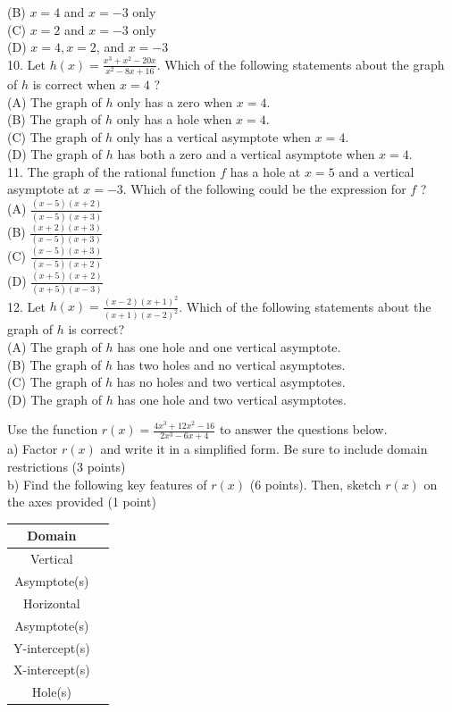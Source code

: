 \documentclass[10pt]{article}
\begin{document}
(B) $x=4$ and $x=-3$ only\\
(C) $x=2$ and $x=-3$ only\\
(D) $x=4, x=2$, and $x=-3$\\
10. Let $h(x)=\frac{x^{3}+x^{2}-20 x}{x^{2}-8 x+16}$. Which of the following statements about the graph of $h$ is correct when $x=4$ ?\\
(A) The graph of $h$ only has a zero when $x=4$.\\
(B) The graph of $h$ only has a hole when $x=4$.\\
(C) The graph of $h$ only has a vertical asymptote when $x=4$.\\
(D) The graph of $h$ has both a zero and a vertical asymptote when $x=4$.\\
11. The graph of the rational function $f$ has a hole at $x=5$ and a vertical asymptote at $x=-3$. Which of the following could be the expression for $f$ ?\\
(A) $\frac{(x-5)(x+2)}{(x-5)(x+3)}$\\
(B) $\frac{(x+2)(x+3)}{(x-5)(x+3)}$\\
(C) $\frac{(x-5)(x+3)}{(x-5)(x+2)}$\\
(D) $\frac{(x+5)(x+2)}{(x+5)(x-3)}$\\
12. Let $h(x)=\frac{(x-2)(x+1)^{2}}{(x+1)(x-2)^{2}}$. Which of the following statements about the graph of $h$ is correct?\\
(A) The graph of $h$ has one hole and one vertical asymptote.\\
(B) The graph of $h$ has two holes and no vertical asymptotes.\\
(C) The graph of $h$ has no holes and two vertical asymptotes.\\
(D) The graph of $h$ has one hole and two vertical asymptotes.

Use the function $r(x)=\frac{4 x^{3}+12 x^{2}-16}{2 x^{3}-6 x+4}$ to answer the questions below.\\
a) Factor $r(x)$ and write it in a simplified form. Be sure to include domain restrictions (3 points)\\
b) Find the following key features of $r(x)$ (6 points). Then, sketch $r(x)$ on the axes provided (1 point)

\begin{center}
\begin{tabular}{|c|l|}
\hline
Domain &  \\
\hline
Vertical &  \\
Asymptote(s) &  \\
\hline
Horizontal &  \\
Asymptote(s) &  \\
\hline
Y-intercept(s) &  \\
\hline
X-intercept(s) &  \\
\hline
Hole(s) &  \\
\hline
\end{tabular}
\end{center}
\end{document}
